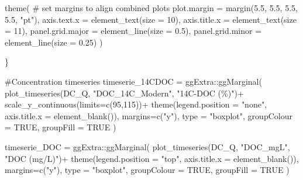 \documentclass[
  letterpaper,
  DIV=11,
  numbers=noendperiod]{scrartcl}
\newenvironment{Shaded}{\begin{snugshade}}{\end{snugshade}}
\newcommand{\AttributeTok}[1]{\textcolor[rgb]{0.40,0.45,0.13}{#1}}
\newcommand{\CommentTok}[1]{\textcolor[rgb]{0.37,0.37,0.37}{#1}}
\newcommand{\ConstantTok}[1]{\textcolor[rgb]{0.56,0.35,0.01}{#1}}
\newcommand{\DecValTok}[1]{\textcolor[rgb]{0.68,0.00,0.00}{#1}}
\newcommand{\FloatTok}[1]{\textcolor[rgb]{0.68,0.00,0.00}{#1}}
\newcommand{\FunctionTok}[1]{\textcolor[rgb]{0.28,0.35,0.67}{#1}}
\newcommand{\NormalTok}[1]{\textcolor[rgb]{0.00,0.23,0.31}{#1}}
\newcommand{\OtherTok}[1]{\textcolor[rgb]{0.00,0.23,0.31}{#1}}
\newcommand{\SpecialCharTok}[1]{\textcolor[rgb]{0.37,0.37,0.37}{#1}}
\newcommand{\StringTok}[1]{\textcolor[rgb]{0.13,0.47,0.30}{#1}}
\begin{document}
\begin{Shaded}
\begin{Highlighting}[]
    \FunctionTok{theme}\NormalTok{( }\CommentTok{\# set margins to align combined plots }
      \AttributeTok{plot.margin =} \FunctionTok{margin}\NormalTok{(}\FloatTok{5.5}\NormalTok{, }\FloatTok{5.5}\NormalTok{, }\FloatTok{5.5}\NormalTok{, }\FloatTok{5.5}\NormalTok{, }\StringTok{"pt"}\NormalTok{),}
      \AttributeTok{axis.text.x =} \FunctionTok{element\_text}\NormalTok{(}\AttributeTok{size =} \DecValTok{10}\NormalTok{),}
      \AttributeTok{axis.title.x =} \FunctionTok{element\_text}\NormalTok{(}\AttributeTok{size =} \DecValTok{11}\NormalTok{),}
      \AttributeTok{panel.grid.major =} \FunctionTok{element\_line}\NormalTok{(}\AttributeTok{size =} \FloatTok{0.5}\NormalTok{),}
      \AttributeTok{panel.grid.minor =} \FunctionTok{element\_line}\NormalTok{(}\AttributeTok{size =} \FloatTok{0.25}\NormalTok{)}
\NormalTok{    )}

\NormalTok{\}}



\CommentTok{\#Concentration timeseries}
\NormalTok{timeserie\_14CDOC }\OtherTok{=}\NormalTok{ ggExtra}\SpecialCharTok{::}\FunctionTok{ggMarginal}\NormalTok{(}
  \FunctionTok{plot\_timeseries}\NormalTok{(DC\_Q, }\StringTok{"DOC\_14C\_Modern"}\NormalTok{, }\StringTok{"14C{-}DOC (\%)"}\NormalTok{)}\SpecialCharTok{+}
  \FunctionTok{scale\_y\_continuous}\NormalTok{(}\AttributeTok{limits=}\FunctionTok{c}\NormalTok{(}\DecValTok{95}\NormalTok{,}\DecValTok{115}\NormalTok{))}\SpecialCharTok{+}
  \FunctionTok{theme}\NormalTok{(}\AttributeTok{legend.position =} \StringTok{"none"}\NormalTok{, }\AttributeTok{axis.title.x =} \FunctionTok{element\_blank}\NormalTok{()),}
  \AttributeTok{margins=}\FunctionTok{c}\NormalTok{(}\StringTok{"y"}\NormalTok{), }\AttributeTok{type =} \StringTok{"boxplot"}\NormalTok{, }\AttributeTok{groupColour =} \ConstantTok{TRUE}\NormalTok{, }\AttributeTok{groupFill =} \ConstantTok{TRUE}\NormalTok{ )}


\NormalTok{timeserie\_DOC }\OtherTok{=}\NormalTok{ ggExtra}\SpecialCharTok{::}\FunctionTok{ggMarginal}\NormalTok{(}
  \FunctionTok{plot\_timeseries}\NormalTok{(DC\_Q, }\StringTok{"DOC\_mgL"}\NormalTok{, }\StringTok{"DOC (mg/L)"}\NormalTok{)}\SpecialCharTok{+}
  \FunctionTok{theme}\NormalTok{(}\AttributeTok{legend.position =} \StringTok{"top"}\NormalTok{, }\AttributeTok{axis.title.x =} \FunctionTok{element\_blank}\NormalTok{()),}
  \AttributeTok{margins=}\FunctionTok{c}\NormalTok{(}\StringTok{"y"}\NormalTok{), }\AttributeTok{type =} \StringTok{"boxplot"}\NormalTok{, }\AttributeTok{groupColour =} \ConstantTok{TRUE}\NormalTok{, }\AttributeTok{groupFill =} \ConstantTok{TRUE}\NormalTok{ )}



\end{Highlighting}
\end{Shaded}
\end{document}
